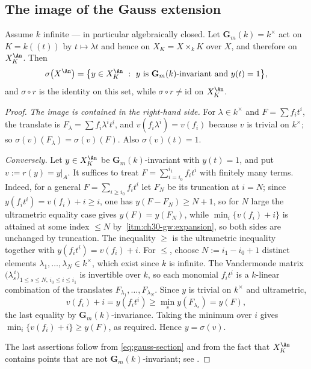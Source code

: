 \subsection{The image of the Gauss extension}
\label{sec:ch30-gauss-image}

\begin{theorem}
\label{thm:ch30-gauss-image}
Assume \(k\) infinite --- in particular algebraically closed.  Let
\(\mathbf G_m(k)=k^\times\) act on \(K=k(\!(t)\!)\) by \(t\mapsto\lambda t\)
and hence on \(X_K=X\times_kK\) over \(X\), and therefore on
\(X_K^{\An}\).  Then
\begin{equation}
\label{eq:ch30-gauss-image}
 \sigma\bigl(X^{\An}\bigr)
 =\bigl\{y\in X_K^{\An}\ :\ y\ \text{is}\ \mathbf G_m(k)\text{-invariant
   and}\ y(t)=1\bigr\},
\end{equation}
and \(\sigma\circ r\) is the identity on this set, while
\(\sigma\circ r\neq\mathrm{id}\) on \(X_K^{\An}\).
\end{theorem}

\begin{proof}
\emph{The image is contained in the right-hand side.}  For
\(\lambda\in k^\times\) and \(F=\sum f_it^i\), the translate is
\(F_\lambda=\sum f_i\lambda^it^i\), and
\(v(f_i\lambda^i)=v(f_i)\) because \(v\) is trivial on \(k^\times\); so
\(\sigma(v)(F_\lambda)=\sigma(v)(F)\).  Also \(\sigma(v)(t)=1\).

\emph{Conversely.}  Let \(y\in X_K^{\An}\) be \(\mathbf G_m(k)\)-invariant
with \(y(t)=1\), and put \(v:=r(y)=y|_A\).  It suffices to treat
\(F=\sum_{i=i_0}^{i_1}f_it^i\) with finitely many terms.  Indeed, for a
general \(F=\sum_{i\geq i_0}f_it^i\) let \(F_N\) be its truncation at
\(i=N\); since \(y(f_it^i)=v(f_i)+i\geq i\), one has
\(y(F-F_N)\geq N+1\), so for \(N\) large the ultrametric equality case gives
\(y(F)=y(F_N)\), while \(\min_i\{v(f_i)+i\}\) is attained at some index
\(\leq N\) by
\,\cref{itm:ch30-gw:expansion}, so both
sides are unchanged by truncation.  The
inequality \(\geq\) is the ultrametric inequality together with
\(y(f_it^i)=v(f_i)+i\).  For \(\leq\), choose \(N:=i_1-i_0+1\) distinct
elements \(\lambda_1,\ldots,\lambda_N\in k^\times\), which exist since
\(k\) is infinite.  The Vandermonde matrix
\(\bigl(\lambda_s^{\,i}\bigr)_{1\leq s\leq N,\,i_0\leq i\leq i_1}\) is
invertible over \(k\), so each monomial \(f_it^i\) is a \(k\)-linear
combination of the translates \(F_{\lambda_1},\ldots,F_{\lambda_N}\).  Since
\(y\) is trivial on \(k^\times\) and ultrametric,
\[
 v(f_i)+i=y(f_it^i)\geq\min_sy(F_{\lambda_s})=y(F),
\]
the last equality by \(\mathbf G_m(k)\)-invariance.  Taking the minimum over
\(i\) gives \(\min_i\{v(f_i)+i\}\geq y(F)\), as required.  Hence
\(y=\sigma(v)\).

The last assertions follow from \eqref{eq:gauss-section} and from the fact
that \(X_K^{\An}\) contains points that are not
\(\mathbf G_m(k)\)-invariant; see
.
\end{proof}

